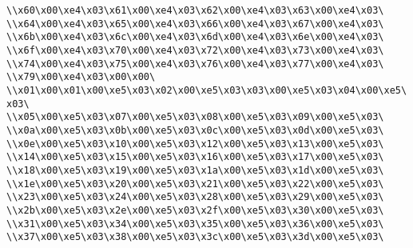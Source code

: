 \verb|\\x60\x00\xe4\x03\x61\x00\xe4\x03\x62\x00\xe4\x03\x63\x00\xe4\x03\|\newline
\verb|\\x64\x00\xe4\x03\x65\x00\xe4\x03\x66\x00\xe4\x03\x67\x00\xe4\x03\|\newline
\verb|\\x6b\x00\xe4\x03\x6c\x00\xe4\x03\x6d\x00\xe4\x03\x6e\x00\xe4\x03\|\newline
\verb|\\x6f\x00\xe4\x03\x70\x00\xe4\x03\x72\x00\xe4\x03\x73\x00\xe4\x03\|\newline
\verb|\\x74\x00\xe4\x03\x75\x00\xe4\x03\x76\x00\xe4\x03\x77\x00\xe4\x03\|\newline
\verb|\\x79\x00\xe4\x03\x00\x00\|\newline
\verb|\\x01\x00\x01\x00\xe5\x03\x02\x00\xe5\x03\x03\x00\xe5\x03\x04\x00\xe5\x03\|\newline
\verb|\\x05\x00\xe5\x03\x07\x00\xe5\x03\x08\x00\xe5\x03\x09\x00\xe5\x03\|\newline
\verb|\\x0a\x00\xe5\x03\x0b\x00\xe5\x03\x0c\x00\xe5\x03\x0d\x00\xe5\x03\|\newline
\verb|\\x0e\x00\xe5\x03\x10\x00\xe5\x03\x12\x00\xe5\x03\x13\x00\xe5\x03\|\newline
\verb|\\x14\x00\xe5\x03\x15\x00\xe5\x03\x16\x00\xe5\x03\x17\x00\xe5\x03\|\newline
\verb|\\x18\x00\xe5\x03\x19\x00\xe5\x03\x1a\x00\xe5\x03\x1d\x00\xe5\x03\|\newline
\verb|\\x1e\x00\xe5\x03\x20\x00\xe5\x03\x21\x00\xe5\x03\x22\x00\xe5\x03\|\newline
\verb|\\x23\x00\xe5\x03\x24\x00\xe5\x03\x28\x00\xe5\x03\x29\x00\xe5\x03\|\newline
\verb|\\x2b\x00\xe5\x03\x2e\x00\xe5\x03\x2f\x00\xe5\x03\x30\x00\xe5\x03\|\newline
\verb|\\x31\x00\xe5\x03\x34\x00\xe5\x03\x35\x00\xe5\x03\x36\x00\xe5\x03\|\newline
\verb|\\x37\x00\xe5\x03\x38\x00\xe5\x03\x3c\x00\xe5\x03\x3d\x00\xe5\x03\|\newline
